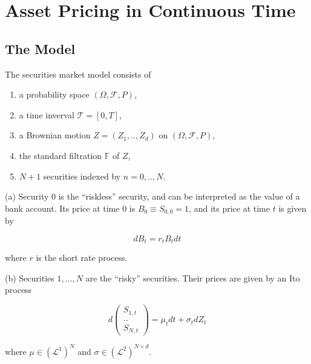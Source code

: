 \documentclass[\topdir/lecture\_notes.tex]{subfiles}
\begin{document}
\graphicspath{{images/}}


\section{Asset Pricing in Continuous Time}

\subsection{The Model}
The securities market model consists of

\begin{enumerate}
  \item a probability space \((\Omega, \mathcal{F}, P)\),

  \item a time inverval \(\mathcal{T}=[0, T]\),

  \item a Brownian motion \(Z=\left(Z_{1}, . ., Z_{d}\right)\) on \((\Omega, \mathcal{F}, P)\),

  \item the standard filtration \(\mathbb{F}\) of \(Z\),

  \item \(N+1\) securities indexed by \(n=0, . ., N\).

\end{enumerate}

(a) Security 0 is the ``riskless'' security, and can be interpreted as the value of a bank account. Its price at time 0 is \(B_{0} \equiv S_{0,0}=1\), and its price at time \(t\) is given by

\begin{equation*}
d B_{t}=r_{t} B_{t} d t
\end{equation*}

where \(r\) is the short rate process.

(b) Securities \(1, \ldots, N\) are the ``risky'' securities. Their prices are given by an Ito process

\begin{equation*}
d\left(\begin{array}{c}
S_{1, t} \\
. . \\
S_{N, t}
\end{array}\right)=\mu_{t} d t+\sigma_{t} d Z_{t}
\end{equation*}

where \(\mu \in\left(\mathcal{L}^{1}\right)^{N}\) and \(\sigma \in\left(\mathcal{L}^{2}\right)^{N \times d}\).
\end{document}
